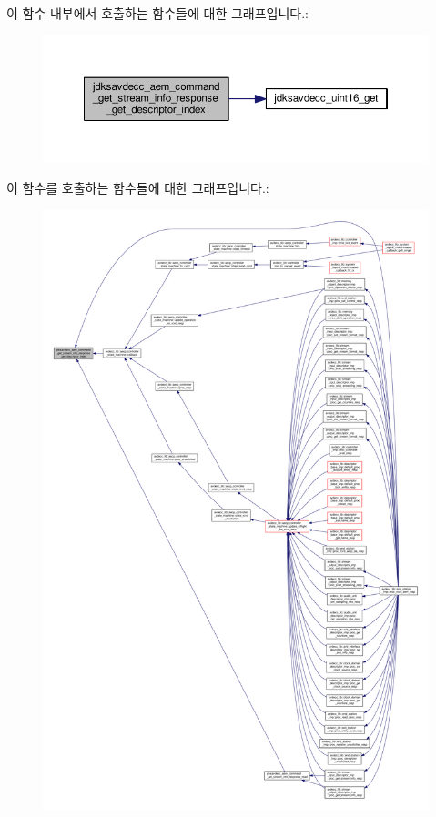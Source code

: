 이 함수 내부에서 호출하는 함수들에 대한 그래프입니다.\+:
\nopagebreak
\begin{figure}[H]
\begin{center}
\leavevmode
\includegraphics[width=350pt]{group__command__get__stream__info__response_ga58de15f7ac5f1bca0d0a586e6c0a35ba_cgraph}
\end{center}
\end{figure}




이 함수를 호출하는 함수들에 대한 그래프입니다.\+:
\nopagebreak
\begin{figure}[H]
\begin{center}
\leavevmode
\includegraphics[width=350pt]{group__command__get__stream__info__response_ga58de15f7ac5f1bca0d0a586e6c0a35ba_icgraph}
\end{center}
\end{figure}


